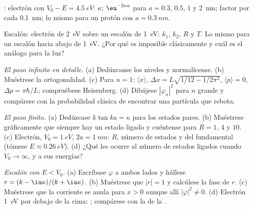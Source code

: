 \begin{exercise}[$\star$]\label{exo:b2:potential-wells-tunneling:3}
: electrón con $V_0 - E = \qty{4.5}{eV}$: $\kappa$; $\eu^{-2\kappa a}$
para $a = 0.3$, $0.5$, $1$ y \qty{2}{nm}; factor por cada \qty{0.1}{nm}; lo mismo para
un protón con $a = \qty{0.3}{nm}$.
\end{exercise}

\begin{exercise}[$\star$]\label{exo:b2:potential-wells-tunneling:4}
Escalón: electrón de \qty{2}{eV} sobre un escalón de \qty{1}{eV}: $k_1$, $k_2$,
$R$ y $T$. Lo mismo para un escalón hacia abajo de \qty{1}{eV}. ¿Por qué es imposible
clásicamente y cuál es el análogo para la luz?
\end{exercise}

\begin{exercise}[$\star\star$]\label{exo:b2:potential-wells-tunneling:5}
\emph{El pozo infinito en detalle.} (a) Dedúzcanse los niveles y normalícense.
(b) Muéstrese la ortogonalidad. (c) Para $n = 1$: $\langle x\rangle$, $\Delta x =
L\sqrt{1/12 - 1/2\pi^2}$, $\langle p\rangle = 0$, $\Delta p = \pi\hbar/L$; compruébese
Heisenberg. (d) Dibújese $|\varphi_n|^2$ para $n$ grande y compárese con la
probabilidad clásica de encontrar una partícula que rebota.
\end{exercise}

\begin{exercise}[$\star\star$]\label{exo:b2:potential-wells-tunneling:6}
\emph{El pozo finito.} (a) Dedúzcase $k\tan ka = \kappa$ para los estados pares.
(b) Muéstrese gráficamente que siempre hay un estado ligado y cuéntense para
$R = 1$, $4$ y $10$. (c) Electrón, $V_0 = \qty{1}{eV}$, $2a = \qty{1}{nm}$:
$R$, número de estados y  del fundamental (tómese
$E \approx \qty{0.26}{eV}$). (d) ¿Qué les ocurre al número de estados ligados
cuando $V_0 \to \infty$, y a sus energías?
\end{exercise}

\begin{exercise}[$\star\star$]\label{exo:b2:potential-wells-tunneling:7}
\emph{Escalón con $E < V_0$.} (a) Escríbase $\varphi$ a ambos lados y hállese $r =
(k - \iu\kappa)/(k + \iu\kappa)$. (b) Muéstrese que $|r| = 1$ y calcúlese la fase
de $r$. (c) Muéstrese que la corriente se anula para $x > 0$ aunque allí $|\varphi|^2 \ne
0$. (d) Electrón \qty{1}{eV} por debajo de la cima: ;
compárese con la  de la .
\end{exercise}

